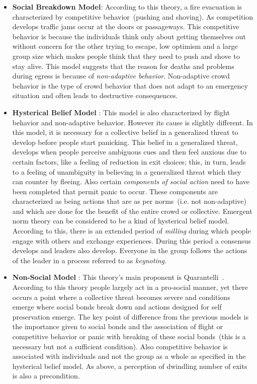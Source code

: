 \begin{itemize}
\item {\bf Social Breakdown Model}: According to this theory, a fire evacuation is characterized by competitive behavior~(pushing and shoving). As competition develops traffic jams occur at the doors or passageways. This competitive behavior is because the individuals think only about getting themselves out without concern for the other trying to escape, low optimism and a large group size which makes people think that they need to push and shove to stay alive. This model suggests that the reason for deaths and problems during egress is because of \emph{non-adaptive behavior}. Non-adaptive crowd behavior is the type of crowd behavior that does not adapt to an emergency situation and often leads to destructive consequences.

\item {\bf Hysterical Belief Model }: This model is also characterized by flight behavior and non-adaptive behavior. However its cause is slightly different. In this model, it is necessary for a collective belief in a generalized threat to develop before people start panicking. This belief in a generalized threat, develops when people perceive ambiguous cues and then feel anxious due to certain factors, like a feeling of reduction in exit choices; this, in turn, leads to a feeling of unambiguity in believing in a generalized threat which they can counter by fleeing. Also certain \emph{components of social action} need to have been completed that permit panic to occur. These components are characterized as being actions that are as per norms~(i.e. not non-adaptive) and which are done for the benefit of the entire crowd or collective. Emergent norm theory can be considered to be a kind of hysterical belief model. According to this, there is an extended period of \emph{milling} during which people engage with others and exchange experiences. During this period a consensus develops and leaders also develop. Everyone in the group follows the actions of the leader in a process referred to as \emph{keynoting}.

\item {\bf Non-Social Model }: This theory's main proponent is Quarantelli~\cite{Quarantelli:1954vr}. According to this theory people largely act in a pro-social manner, yet there occurs a point where a collective threat becomes severe and conditions emerge where social bonds break down and actions designed for self preservation emerge. The key point of difference from the previous models is the importance given to social bonds and the association of flight or competitive behavior or panic with breaking of these social bonds~(this is a necessary but not a sufficient condition). Also competitive behavior is associated with individuals and not the group as a whole as specified in the hysterical belief model. As above, a perception of dwindling number of exits is also a precondition.


\end{itemize}
